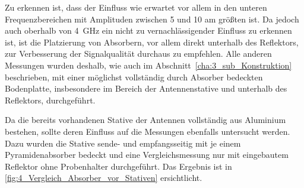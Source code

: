 Zu erkennen ist, dass der Einfluss wie erwartet vor allem in den unteren Frequenzbereichen mit Amplituden zwischen \SI{5}{\Dezibel} und \SI{10}{\Dezibel} am größten ist. Da jedoch auch oberhalb von \SI{4}{\giga\hertz} ein nicht zu vernachlässigender Einfluss zu erkennen ist, ist die Platzierung von Absorbern, vor allem direkt unterhalb des Reflektors, zur Verbesserung der Signalqualität durchaus zu empfehlen. Alle anderen Messungen wurden deshalb, wie auch im Abschnitt~\ref{cha:3_sub_Konstruktion} beschrieben, mit einer möglichst vollständig durch Absorber bedeckten Bodenplatte, insbesondere im Bereich der Antennenstative und unterhalb des Reflektors, durchgeführt.
\par
\vspace{\linespace}
Da die bereits vorhandenen Stative der Antennen vollständig aus Aluminium bestehen, sollte deren Einfluss auf die Messungen ebenfalls untersucht werden. Dazu wurden die Stative sende- und empfangsseitig mit je einem Pyramidenabsorber bedeckt und eine Vergleichsmessung nur mit eingebautem Reflektor ohne Probenhalter durchgeführt. Das Ergebnis ist in \Abb\ref{fig:4_Vergleich_Absorber_vor_Stativen} ersichtlicht.
\par
\vspace{\linespace}


